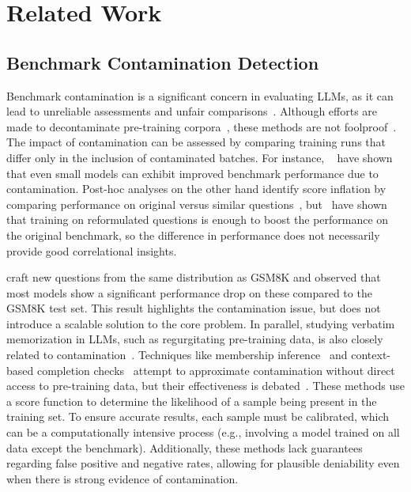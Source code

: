 \vspace{-0.2cm}
\section{Related Work}\label{sec:related}




\subsection{Benchmark Contamination Detection}
Benchmark contamination is a significant concern in evaluating LLMs, as it can lead to unreliable assessments and unfair comparisons~\citep{singh2024evaluation, balloccu2024leak}. 
Although efforts are made to decontaminate pre-training corpora~\citep{brown2020language}, these methods are not foolproof~\citep{singh2024evaluation}.
The impact of contamination can be assessed by comparing training runs that differ only in the inclusion of contaminated batches. 
For instance, ~\citet{jiang2024investigating} have shown that even small models can exhibit improved benchmark performance due to contamination.
Post-hoc analyses on the other hand identify score inflation by comparing performance on original versus similar questions~\citep{brown2020language, chowdhery2023palm, touvron2023llama}, but~\citet{yang2023rethinking} have shown that training on reformulated questions is enough to boost the performance on the original benchmark, so the difference in performance does not necessarily provide good correlational insights.

\citet{zhang2024careful} craft new questions from the same distribution as GSM8K and observed that most models show a significant performance drop on these compared to the GSM8K test set. 
This result highlights the contamination issue, but does not introduce a scalable solution to the core problem.
In parallel, studying verbatim memorization in LLMs, such as regurgitating pre-training data, is also closely related to contamination~\citep{carlini2022quantifying, hartmann2023sok}.
Techniques like membership inference~\citep{mireshghallah2022quantifying} and context-based completion checks~\citep{golchin2023data} attempt to approximate contamination without direct access to pre-training data, but their effectiveness is debated~\citep{duan2024membership}.
These methods use a score function to determine the likelihood of a sample being present in the training set. To ensure accurate results, each sample must be calibrated, which can be a computationally intensive process (e.g., involving a model trained on all data except the benchmark). 
Additionally, these methods lack guarantees regarding false positive and negative rates, allowing for plausible deniability even when there is strong evidence of contamination.
